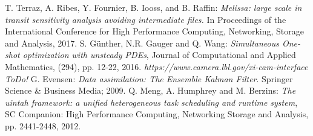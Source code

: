 \begin{thebibliography}{0}
T. Terraz, A. Ribes, Y. Fournier, B. Iooss, and B. Raffin:
\textsl{Melissa: large scale in transit sensitivity analysis avoiding intermediate files.} 
In Proceedings of the International Conference for High Performance Computing, Networking, Storage and Analysis, 2017.
%
S. Günther, N.R. Gauger and Q. Wang: 
\textsl{Simultaneous One-shot optimization with unsteady PDEs}, 
Journal of Computational and Applied Mathematics, (294), pp. 12-22, 2016.
%
 \textsl{https://www.camera.lbl.gov/xi-cam-interface}
%
 \textsl{ToDo!}
%
G. Evensen: 
\textsl{Data assimilation: The Ensemble Kalman Filter}. 
Springer Science \& Business Media; 2009.
%
 Q. Meng, A. Humphrey and M. Berzins: 
\textsl{The uintah framework: a unified heterogeneous task scheduling and runtime system},
SC Companion: High Performance Computing, Networking Storage and Analysis, 
pp. 2441-2448, 2012.
\end{thebibliography}


